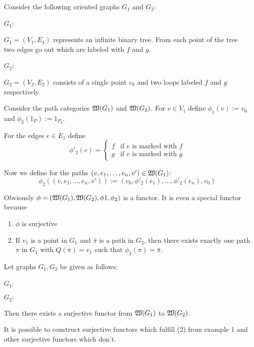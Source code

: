 \begin{example}
Consider the following oriented graphs $G_1$ and $G_2$:

$G_1$:
\begin{center}

\end{center}

$G_1 = (V_1, E_1)$ represents an infinite binary tree. From each point of the
tree two edges go out which are labeled with $f$ and $g$.

$G_2$:
\begin{center}

\end{center}

$G_2 = (V_2, E_2)$ consists of a single point $v_0$ and two loops labeled $f$ and $g$ respectively.

Consider the path categories $\mbox{$\mathfrak{W}({G_1})$}$ and $\mbox{$\mathfrak{W}({G_2})$}$. For $v
\in V_1$ define $\phi_1(v) := v_0$ and $\phi_2(1_P) := 1_{P_0}$.

For the edges $e \in E_1$ define
\[ \phi'_2(e) = \begin{cases}
	f & \text{if $e$ is marked with $f$} \\ 
	g & \text{if $e$ is marked with $g$}
\end{cases} \]

Now we define for the paths $(v, e_1, \ldots, e_n, v') \in \mbox{$\mathfrak{W}({G_1})$}$:
\[ \phi_2((v, e_1, \ldots, e_n, v')) := (v_0, \phi'_2(e_1), \ldots,
\phi'_2(e_n), v_0) \]

Obviously $\phi = (\mbox{$\mathfrak{W}({G_1})$}, \mbox{$\mathfrak{W}({G_2})$}, \phi1, \phi_2)$ is a
functor. It is even a special functor because
\begin{enumerate}
  \item $\phi$ is surjective
  \item If $v_1$ is a point in $G_1$ and $\bar{\pi}$ is a path in $G_2$, then
  there exists exactly one path $\pi$ in $G_1$ with $Q(\pi) = v_1$ such that
  $\phi_2(\pi) = \bar{\pi}$.
\end{enumerate}
\end{example}

\bigskip
\begin{example}
Let graphs $G_1, G_2$ be given as follows:

$G_1$:
\begin{center}

\end{center}

$G_2:$
\begin{center}

\end{center}

Then there exists a surjective functor from $\mbox{$\mathfrak{W}({G_1})$}$ to $\mbox{$\mathfrak{W}({G_2})$}$.

It is possible to construct surjective functors which fulfill (2) from example 1
and other surjective functors which don't.
\end{example}

